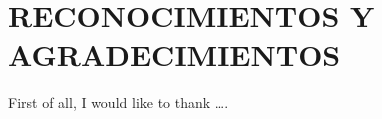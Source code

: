 \chapter*{RECONOCIMIENTOS Y AGRADECIMIENTOS}

\vspace{1cm}

First of all, I would like to thank \ldots.
